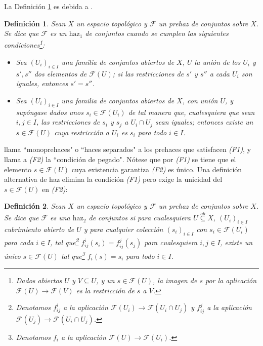 \documentclass[letterpaper]{article} %
\date{}
\newtheorem{Def}{Definición}
\newcommand{\subseteqab}{\stackrel{ab}{\subseteq}}
\renewenvironment{abstract}
{\small
   \list{}{%
      \setlength{\leftmargin}{1.4cm}%
      \setlength{\rightmargin}{\leftmargin}%
   }%
   \item\relax}
{\endlist}
\begin{document}
   
   \vspace{1cm}

   \begin{abstract}
      
   \end{abstract}
   \vspace{1cm}

   La Definición \ref{def:Godement} es debida a \cite[p.~109]{TATF}. 

   \begin{Def}\label{def:Godement}
      Sean $X$ un espacio topológico y $\mathscr{F}$ un prehaz de conjuntos sobre $X$. Se dice que $\mathscr{F}$ es un ${\text{haz}_1}$ de conjuntos cuando se cumplen las siguientes condiciones\footnote{Dados abiertos $U$ y $V\subseteq U$, y un $s\in\mathscr{F}(U)$, la imagen de $s$ por la aplicación $\mathscr{F}(U)\to\mathscr{F}(V)$ es la restricción de $s$ a $V$.}:
      \begin{itemize}
         \item[(F1):] Sea $(U_i)_{i\in I}$ una familia de conjuntos abiertos de $X$, $U$ la unión de los $U_i$ y $s',s''$ dos elementos de $\mathscr{F}(U)$; si las restricciones de $s'$ y $s''$ a cada $U_i$ son iguales, entonces $s'=s''$.
         \item[(F2):] Sea $(U_i)_{i\in I}$ una familia de conjuntos abiertos de $X$, con unión $U$, y supóngase dados unos $s_i\in \mathscr{F}(U_i)$ de tal manera que, cualesquiera que sean $i,j\in I$, las restricciones de $s_i$ y $s_j$ a $U_i\cap U_j$ sean iguales; entonces existe un $s\in \mathscr{F}(U)$ cuya restricción a $U_i$ es $s_i$ para todo $i\in I$.
      \end{itemize}
   \end{Def}

   \cite[p,~14]{ST} llama ``monoprehaces" o ``haces separados" a los prehaces que satisfacen \textit{(F1)}, y llama a \textit{(F2)} la ``condición de pegado". Nótese que por \textit{(F1)} se tiene que el elemento $s\in \mathscr{F}(U)$ cuya existencia garantiza \textit{(F2)} es único. Una definición alternativa de haz elimina la condición \textit{(F1)} pero exige la unicidad del $s\in \mathscr{F}(U)$ en \textit{(F2)}:

   \begin{Def}
      Sean $X$ un espacio topológico y $\mathscr{F}$ un prehaz de conjuntos sobre $X$. Se dice que $\mathscr{F}$ es una $\text{haz}_2$ de conjuntos si para cualesquiera $U\subseteqab X$, $(U_i)_{i\in I}$ cubrimiento abierto de $U$ y para cualquier colección $(s_i)_{i\in I}$ con $s_i\in \mathscr{F}(U_i)$ para cada $i\in I$, tal que\footnote{Denotamos $f^i_{ij}$ a la aplicación $\mathscr{F}(U_i)\to\mathscr{F}(U_i\cap U_j)$ y $f^j_{ij}$ a la aplicación $\mathscr{F}(U_j)\to\mathscr{F}(U_i\cap U_j)$.} $f^i_{ij}(s_i)=f^j_{ij}(s_j)$ para cualesquiera $i,j\in I$, existe un único $s\in \mathscr{F}(U)$ tal que\footnote{Denotamos $f_i$ a la aplicación $\mathscr{F}(U)\to\mathscr{F}(U_i)$.} $f_i(s)=s_i$ para todo $i\in I$. 
   \end{Def}
\end{document}
